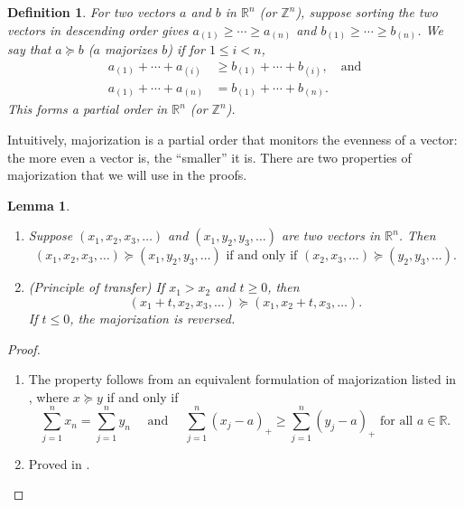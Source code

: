 \documentclass[aos, authoryear]{imsart}
\newtheorem{definition}{Definition}
\newtheorem{lemma}[corollary]{Lemma}
\theoremstyle{definition}
\theoremstyle{custom}
\newcommand{\RR}{\mathbb{R}}
\newcommand{\ZZ}{\mathbb{Z}}
\begin{document}
\begin{definition}
For two vectors $a$ and $b$ in $\RR^n$ (or $\ZZ^n$), suppose sorting the two vectors in descending order gives
$a_{\left(1\right)} \ge \cdots \ge a_{\left(n\right)}$ and $b_{\left(1\right)} \ge \cdots \ge b_{\left(n\right)}$. We say that $a \succeq b$ ($a$ majorizes $b$) if for $1 \le i < n$,
\begin{align*}
a_{\left(1\right)} + \cdots + a_{\left(i\right)} & \ge b_{\left(1\right)} + \cdots + b_{\left(i\right)}, \quad \text{and}\\
a_{\left(1\right)} + \cdots + a_{\left(n\right)} & = b_{\left(1\right)} + \cdots + b_{\left(n\right)}.
\end{align*}
This forms a partial order in $\RR^n$ (or $\ZZ^n$).
\end{definition}

Intuitively, majorization is a partial order that monitors the evenness of a vector: the more even a vector is, the ``smaller'' it is. There are two properties of majorization that we will use in the proofs.

\begin{lemma}\leavevmode
\label{lma:twoprop}
\begin{enumerate}
\item Suppose $\left(x_1, x_2, x_3, \ldots\right)$ and $\left(x_1, y_2, y_3, \ldots\right)$ are two vectors in $\RR^n$. Then
\[\left(x_1, x_2, x_3, \ldots\right) \succeq \left(x_1, y_2, y_3, \ldots\right) \text{ if and only if } \left(x_2, x_3, \ldots\right) \succeq \left(y_2, y_3, \ldots\right).\]
\item (Principle of transfer) If $x_1 > x_2$ and $t \ge 0$, then
\[\left(x_1 + t, x_2, x_3, \ldots\right) \succeq \left(x_1, x_2 + t, x_3, \ldots\right).\]
If $t \le 0$, the majorization is reversed.
\end{enumerate}
\end{lemma}

\begin{proof}\leavevmode
\begin{enumerate}
\item The property follows from an equivalent formulation of majorization listed in \citet{Marshall:2010hb}, where $x \succeq y$ if and only if
\[\sum_{j=1}^n x_n = \sum_{j=1}^n y_n \quad \text{ and } \quad \sum_{j=1}^n \left(x_j - a\right)_+ \ge \sum_{j=1}^n \left(y_j - a\right)_+ \text{ for all } a \in \RR.\]

\item Proved in \citet{Marshall:2010hb}. \qedhere
\end{enumerate}
\end{proof}
\end{document}
